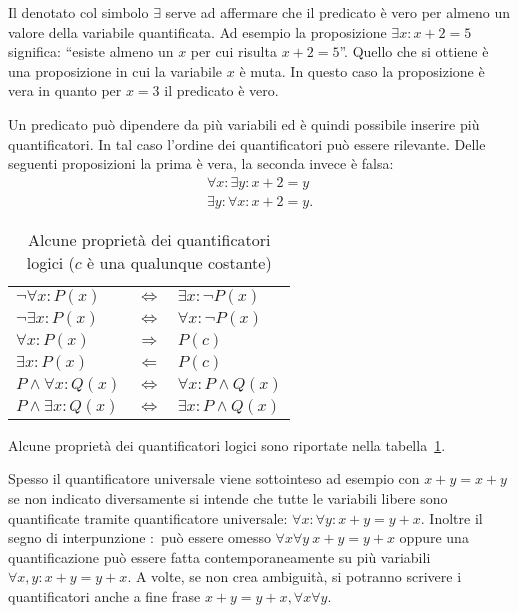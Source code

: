 Il  denotato col simbolo
$\exists$ serve ad affermare che il predicato è vero per
almeno un valore della variabile quantificata.
Ad esempio la proposizione $\exists x\colon x+2=5$ significa:
``esiste almeno un $x$ per cui risulta $x+2=5$''.
Quello che si ottiene è una proposizione in cui la variabile
$x$ è muta. In questo caso la proposizione è vera in quanto
per $x=3$ il predicato è vero.

Un predicato può dipendere da più variabili ed è quindi
possibile inserire più quantificatori. In tal caso l'ordine
dei quantificatori può essere rilevante.
Delle seguenti proposizioni la prima è vera, la seconda
invece è falsa:
\begin{gather*}
\forall x\colon \exists y\colon x+2=y \\
\exists y\colon \forall x\colon x+2=y.
\end{gather*}

\begin{table}
\begin{center}
\begin{tabular}{lcl}
$\lnot \forall x \colon P(x)$ & $\iff$ & $\exists x \colon \lnot P(x)$\\
$\lnot \exists x \colon P(x)$ & $\iff$ & $\forall x \colon \lnot P(x)$\\
$\forall x \colon P(x)$ & $\Longrightarrow$ & $P(c)$\\
$\exists x \colon P(x)$ & $\Longleftarrow$ & $P(c)$\\
$P \land \forall x \colon Q(x)$ & $\iff$ & $\forall x\colon P\land Q(x)$\\
$P \land \exists x \colon Q(x)$ & $\iff$ & $\exists x \colon P \land Q(x)$
\end{tabular}
\end{center}
\caption{Alcune proprietà dei quantificatori logici ($c$ è una qualunque costante)}
\label{tab:proprieta_quantificatori}
\end{table}

Alcune proprietà dei quantificatori logici sono riportate
nella tabella~\ref{tab:proprieta_quantificatori}.

Spesso il quantificatore universale viene sottointeso 
ad esempio con $x+y=x+y$
se non indicato diversamente 
si intende che tutte le variabili libere sono quantificate 
tramite quantificatore universale: 
$\forall x\colon \forall y\colon x+y=y+x$. 
Inoltre il segno di interpunzione $\colon$ può essere omesso
$\forall x \forall y\ x+y=y+x$
oppure una quantificazione può essere fatta contemporaneamente 
su più variabili $\forall x,y\colon x+y = y+x$.
A volte, se non crea ambiguità, si potranno scrivere 
i quantificatori anche a fine frase $x+y=y+x, \forall x\forall y$.

